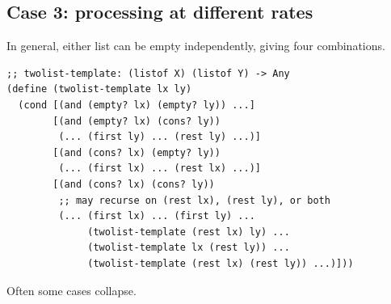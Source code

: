 \subsection{Case 3: processing at different rates}
In general, either list can be empty independently, giving four combinations.

\begin{lstlisting}[style=racket]
;; twolist-template: (listof X) (listof Y) -> Any
(define (twolist-template lx ly)
  (cond [(and (empty? lx) (empty? ly)) ...]
        [(and (empty? lx) (cons? ly))
         (... (first ly) ... (rest ly) ...)]
        [(and (cons? lx) (empty? ly))
         (... (first lx) ... (rest lx) ...)]
        [(and (cons? lx) (cons? ly))
         ;; may recurse on (rest lx), (rest ly), or both
         (... (first lx) ... (first ly) ...
              (twolist-template (rest lx) ly) ...
              (twolist-template lx (rest ly)) ...
              (twolist-template (rest lx) (rest ly)) ...)]))
\end{lstlisting}
Often some cases collapse.

